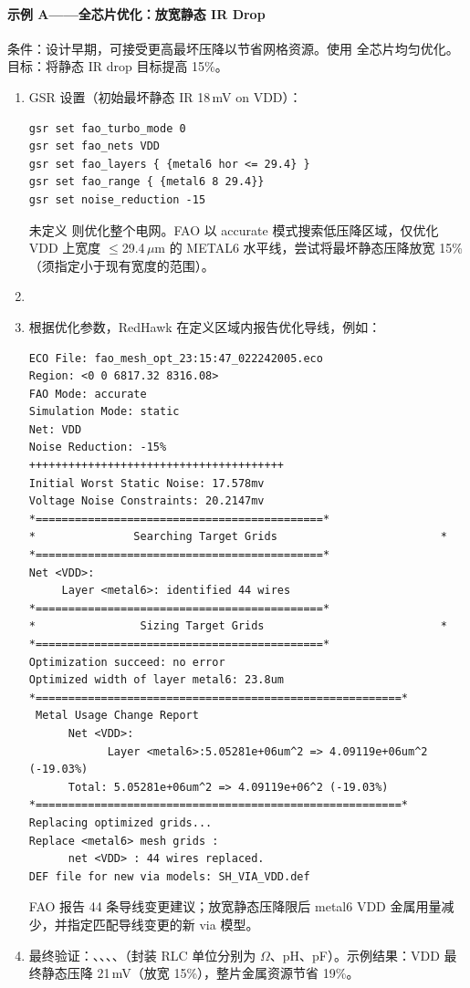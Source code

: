 \paragraph{示例 A——全芯片优化：放宽静态 IR Drop}
条件：设计早期，可接受更高最坏压降以节省网格资源。使用  全芯片均匀优化。目标：将静态 IR drop 目标提高 15\%。
\begin{enumerate}
  \item GSR 设置（初始最坏静态 IR 18\,mV on VDD）：
\begin{lstlisting}
gsr set fao_turbo_mode 0
gsr set fao_nets VDD
gsr set fao_layers { {metal6 hor <= 29.4} }
gsr set fao_range { {metal6 8 29.4}}
gsr set noise_reduction -15
\end{lstlisting}
  未定义  则优化整个电网。FAO 以 accurate 模式搜索低压降区域，仅优化 VDD 上宽度 $\leq$29.4\,$\mu$m 的 METAL6 水平线，尝试将最坏静态压降放宽 15\%（须指定小于现有宽度的范围）。
  \item {}
  \item 根据优化参数，RedHawk 在定义区域内报告优化导线，例如：
\begin{lstlisting}
ECO File: fao_mesh_opt_23:15:47_022242005.eco
Region: <0 0 6817.32 8316.08>
FAO Mode: accurate
Simulation Mode: static
Net: VDD
Noise Reduction: -15%
+++++++++++++++++++++++++++++++++++++++
Initial Worst Static Noise: 17.578mv
Voltage Noise Constraints: 20.2147mv
*============================================*
*               Searching Target Grids                         *
*============================================*
Net <VDD>:
     Layer <metal6>: identified 44 wires
*============================================*
*                Sizing Target Grids                           *
*============================================*
Optimization succeed: no error
Optimized width of layer metal6: 23.8um
*========================================================*
 Metal Usage Change Report
      Net <VDD>:
            Layer <metal6>:5.05281e+06um^2 => 4.09119e+06um^2 (-19.03%)
      Total: 5.05281e+06um^2 => 4.09119e+06^2 (-19.03%)
*========================================================*
Replacing optimized grids...
Replace <metal6> mesh grids :
      net <VDD> : 44 wires replaced.
DEF file for new via models: SH_VIA_VDD.def
\end{lstlisting}
  FAO 报告 44 条导线变更建议；放宽静态压降限后 metal6 VDD 金属用量减少，并指定匹配导线变更的新 via 模型。
  \item 最终验证：、、、、（封装 RLC 单位分别为 $\Omega$、pH、pF）。示例结果：VDD 最终静态压降 21\,mV（放宽 15\%），整片金属资源节省 19\%。
\end{enumerate}

